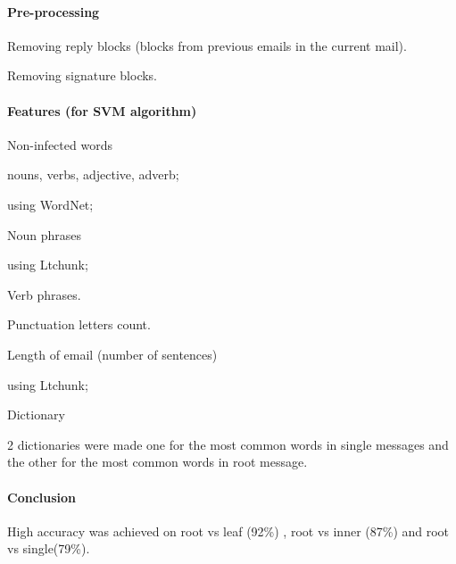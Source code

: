 \documentclass[12pt]{article}
\newenvironment{my_itemize}
{\begin{itemize}
  \setlength{\itemsep}{0cm}
  \setlength{\parskip}{0cm}}
{\end{itemize}}
\begin{document}
\paragraph{Pre-processing}
\begin{my_itemize}
    \item Removing reply blocks (blocks from previous emails in the current mail).
    \item Removing signature blocks.
\end{my_itemize}

\paragraph{Features (for SVM algorithm)}
\begin{my_itemize}
    \item Non-infected words
    \begin{my_itemize}
        \item nouns, verbs, adjective, adverb;
        \item using WordNet;
    \end{my_itemize}
    \item Noun phrases
    \begin{my_itemize}
        \item using Ltchunk;
    \end{my_itemize}
    \item Verb phrases.
    \item Punctuation letters count.
    \item Length of email (number of sentences)
    \begin{my_itemize}
        \item using Ltchunk;
    \end{my_itemize}
    \item Dictionary
    \begin{my_itemize}
        \item 2 dictionaries were made one for the most common words in single 
	      messages and the other for the most common words in root message.
    \end{my_itemize}
\end{my_itemize}

\paragraph{Conclusion}
\begin{my_itemize}
    \item High accuracy was achieved on root vs leaf (92\%) , root vs inner (87\%) and root vs single(79\%).
\end{my_itemize}
\end{document}
